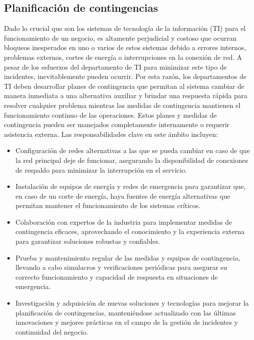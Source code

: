 \documentclass{article}
\begin{document}
\subsection{Planificación de contingencias}
Dado lo crucial que son los sistemas de tecnología de la información (TI) para el funcionamiento de un negocio, es altamente perjudicial y costoso que ocurran bloqueos inesperados en uno o varios de estos sistemas debido a errores internos, problemas externos, cortes de energía o interrupciones en la conexión de red. A pesar de los esfuerzos del departamento de TI para minimizar este tipo de incidentes, inevitablemente pueden ocurrir. Por esta razón, los departamentos de TI deben desarrollar planes de contingencia que permitan al sistema cambiar de manera inmediata a una alternativa auxiliar y brindar una respuesta rápida para resolver cualquier problema mientras las medidas de contingencia mantienen el funcionamiento continuo de las operaciones.
Estos planes y medidas de contingencia pueden ser manejados completamente internamente o requerir asistencia externa. Las responsabilidades clave en este ámbito incluyen:
\begin{itemize}[label=$\circ$][label=$\circ$]
    \item Configuración de redes alternativas a las que se pueda cambiar en caso de que la red principal deje de funcionar, asegurando la disponibilidad de conexiones de respaldo para minimizar la interrupción en el servicio.
    \item Instalación de equipos de energía y redes de emergencia para garantizar que, en caso de un corte de energía, haya fuentes de energía alternativas que permitan mantener el funcionamiento de los sistemas críticos.
    \item Colaboración con expertos de la industria para implementar medidas de contingencia eficaces, aprovechando el conocimiento y la experiencia externa para garantizar soluciones robustas y confiables.
    \item Prueba y mantenimiento regular de las medidas y equipos de contingencia, llevando a cabo simulacros y verificaciones periódicas para asegurar su correcto funcionamiento y capacidad de respuesta en situaciones de emergencia.
    \item Investigación y adquisición de nuevas soluciones y tecnologías para mejorar la planificación de contingencias, manteniéndose actualizado con las últimas innovaciones y mejores prácticas en el campo de la gestión de incidentes y continuidad del negocio.
\end{itemize}
\end{document}
